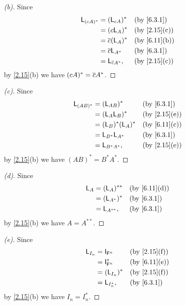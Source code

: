 \begin{proof}[(b)]
  Since
  \begin{align*}
    \L_{(cA)^*} & = (\L_{cA})^*        &  & \text{(by \cref{6.3.1})}   \\
                & = (c \L_A)^*         &  & \text{(by \cref{2.15}(c))} \\
                & = \conj{c} (\L_A)^*  &  & \text{(by \cref{6.11}(b))} \\
                & = \conj{c} \L_{A^*}  &  & \text{(by \cref{6.3.1})}   \\
                & = \L_{\conj{c} A^*}, &  & \text{(by \cref{2.15}(c))}
  \end{align*}
  by \cref{2.15}(b) we have \((cA)^* = \overline{c} A^*\).
\end{proof}

\begin{proof}[(c)]
  Since
  \begin{align*}
    \L_{(AB)^*} & = (\L_{AB})^*       &  & \text{(by \cref{6.3.1})}   \\
                & = (\L_A \L_B)^*     &  & \text{(by \cref{2.15}(e))} \\
                & = (\L_B)^* (\L_A)^* &  & \text{(by \cref{6.11}(c))} \\
                & = \L_{B^*} \L_{A^*} &  & \text{(by \cref{6.3.1})}   \\
                & = \L_{B^* A^*},     &  & \text{(by \cref{2.15}(e))}
  \end{align*}
  by \cref{2.15}(b) we have \((AB)^* = B^* A^*\).
\end{proof}

\begin{proof}[(d)]
  Since
  \begin{align*}
    \L_A & = (\L_A)^{**}  &  & \text{(by \cref{6.11}(d))} \\
         & = (\L_{A^*})^* &  & \text{(by \cref{6.3.1})}   \\
         & = \L_{A^{**}}, &  & \text{(by \cref{6.3.1})}
  \end{align*}
  by \cref{2.15}(b) we have \(A = A^{**}\).
\end{proof}

\begin{proof}[(e)]
  Since
  \begin{align*}
    \L_{I_n} & = \IT[\vs{F}^n]   &  & \text{(by \cref{2.15}(f))} \\
             & = \IT[\vs{F}^n]^* &  & \text{(by \cref{6.11}(e))} \\
             & = (\L_{I_n})^*    &  & \text{(by \cref{2.15}(f))} \\
             & = \L_{I_n^*},     &  & \text{(by \cref{6.3.1})}
  \end{align*}
  by \cref{2.15}(b) we have \(I_n = I_n^*\).
\end{proof}

